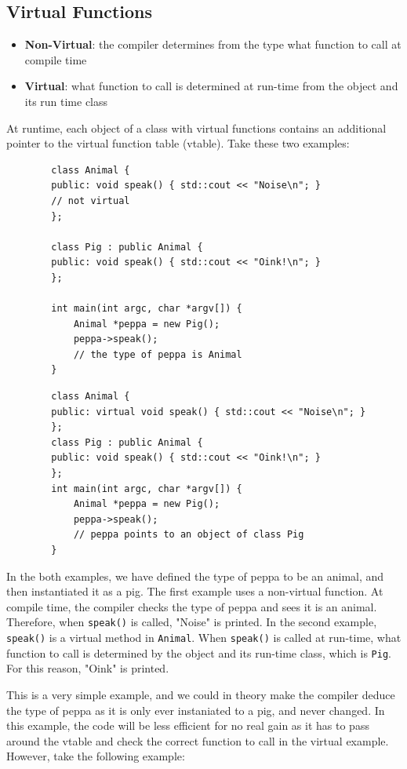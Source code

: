 \documentclass{article}
\begin{document}
	\subsection{Virtual Functions}
	\begin{itemize}
		\item \textbf{Non-Virtual}: the compiler determines from the type what function to call at compile time
		\item \textbf{Virtual}: what function to call is determined at run-time from the object and its run time class
	\end{itemize}
	
	At runtime, each object of a class with virtual functions contains an additional pointer to the virtual function table (vtable). Take these two examples:
	
	\begin{verbatim}
		class Animal {
		public: void speak() { std::cout << "Noise\n"; }
		// not virtual
		};
		
		class Pig : public Animal {
		public: void speak() { std::cout << "Oink!\n"; }
		};
		
		int main(int argc, char *argv[]) {
		    Animal *peppa = new Pig();
		    peppa->speak();
		    // the type of peppa is Animal
		}
	\end{verbatim}		
	
	\begin{verbatim}
		class Animal {
		public: virtual void speak() { std::cout << "Noise\n"; }
		};
		class Pig : public Animal {
		public: void speak() { std::cout << "Oink!\n"; }
		};
		int main(int argc, char *argv[]) {
		    Animal *peppa = new Pig();
		    peppa->speak();
		    // peppa points to an object of class Pig
		}
	\end{verbatim}
	
	In the both examples, we have defined the type of peppa to be an animal, and then instantiated it as a pig. The first example uses a non-virtual function. At compile time, the compiler checks the type of peppa and sees it is an animal. Therefore, when \texttt{speak()} is called, "Noise" is printed. In the second example, \texttt{speak()} is a virtual method in \texttt{Animal}.  When \texttt{speak()} is called at run-time, what function to call is determined by the object and its run-time class, which is  \texttt{Pig}. For this reason, "Oink" is printed.
	
	\par This is a very simple example, and we could in theory make the compiler deduce the type of peppa as it is only ever instaniated to a pig, and never changed. In this example, the code will be less efficient for no real gain as it has to pass around the vtable and check the correct function to call in the virtual example. However, take the following example:
	
\end{document}
